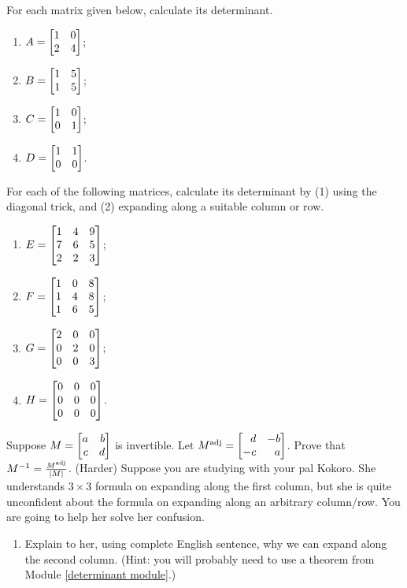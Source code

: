 \begin{exercises}
	\begin{problist}
		\prob For each matrix given below, calculate its determinant.
		\begin{enumerate}
			\item $A=\mat{1 & 0 \\ 2 & 4}$;

			\item $B=\mat{1 & 5 \\ 1 & 5}$;

			\item $C=\mat{1 & 0 \\ 0 & 1}$;

			\item $D=\mat{1 & 1 \\ 0 & 0}$.
		\end{enumerate}
		\prob For each of the following matrices, calculate its determinant by (1)
		using the diagonal trick, and (2) expanding along a suitable column or row.
		\begin{enumerate}
			\item $E=\mat{1 & 4 & 9 \\ 7 & 6 & 5 \\ 2 & 2 & 3}$;

			\item $F=\mat{1 & 0 & 8 \\ 1 & 4 & 8 \\ 1 & 6 & 5}$;

			\item $G=\mat{2 & 0 & 0 \\ 0 & 2 & 0 \\ 0 & 0 & 3}$;

			\item $H=\mat{0 & 0 & 0 \\ 0 & 0 & 0 \\ 0 & 0 & 0}$.
		\end{enumerate}
		\prob Suppose $M=\mat{a & b \\ c & d}$ is invertible. Let $M^{\text{adj}}
		=\mat{d & -b \\ -c & a}$. Prove that
		$M^{-1}=\frac{M^{\text{adj}}}{\lvert M\rvert}$. \prob (Harder) Suppose you are studying
		with your pal Kokoro. She understands $3\times 3$ formula on expanding
		along the first column, but she is quite unconfident about the formula on
		expanding along an arbitrary column/row. You are going to help her solve
		her confusion.
		\begin{enumerate}
			\item Explain to her, using complete English sentence, why we can expand
				along the second column. (Hint: you will probably need to use a
				theorem from Module \ref{determinant module}.)


\end{enumerate}
\end{problist}
\end{exercises}
